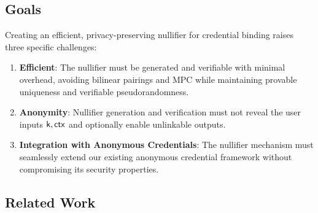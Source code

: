 \subsection{Goals}

Creating an efficient, privacy-preserving nullifier for credential binding raises three specific challenges:
\begin{enumerate}
    \item \textbf{Efficient}: The nullifier must be generated and verifiable with minimal overhead, avoiding bilinear pairings and MPC while maintaining provable uniqueness and verifiable pseudorandomness.
    
    \item \textbf{Anonymity}: Nullifier generation and verification must not reveal the user inputs $\mathsf{k}, \mathsf{ctx}$ and optionally enable unlinkable outputs. 
    
    \item \textbf{Integration with Anonymous Credentials}: The nullifier mechanism must seamlessly extend our existing anonymous credential framework without compromising its security properties.
\end{enumerate}


\subsection{Related Work}

